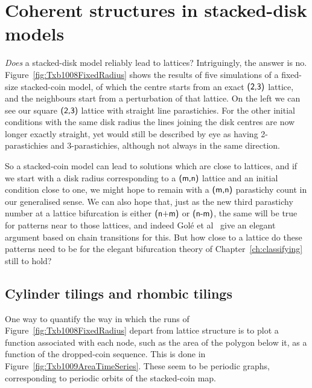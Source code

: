 \section{Coherent structures in stacked-disk models}

\textit{Does} a stacked-disk model reliably lead to lattices? Intriguingly, the answer is no. 
Figure~\ref{fig:Txb1008FixedRadius} shows the results of five simulations of a fixed-size stacked-coin model, of which the centre starts from an exact $\textsf{(2,3)}$ lattice, and the neighbours start from a perturbation of that lattice.
On the left we can see our square $\textsf{(2,3)}$ lattice with straight line parastichies. For the other initial conditions with the same disk radius the lines joining the disk centres are now longer exactly straight, yet would still be described by eye as having 2-parastichies and 3-parastichies, although not always in the same direction.

So a stacked-coin model can lead to solutions which are close to lattices, and if we start with a disk radius corresponding to a $\textsf{(m,n)}$ lattice and an initial condition close to one, we might  hope to remain with a $\textsf{(m,n)}$ parastichy count in our generalised sense. We can also hope that, just as the new third parastichy number at a lattice bifurcation is either $\textsf{(n+m)}$ or $\textsf{(n-m)}$, the same will be true for patterns near to those lattices, and indeed Golé et al~\cite{goleFibonacciQuasisymmetricPhyllotaxis2016} give an elegant argument based on chain transitions for this. But how close to a lattice do these patterns need to be for  the  elegant bifurcation theory of Chapter~\ref{ch:classifying} still to hold? 


\subsection{Cylinder tilings and rhombic tilings}
\label{sec:tilings}

One way to quantify the way in which the runs of Figure~\ref{fig:Txb1008FixedRadius} depart from lattice structure is to plot a function associated with each node, such as the area of the polygon below it,  as a function of the dropped-coin sequence. This is done in Figure~\ref{fig:Txb1009AreaTimeSeries}. These seem to be periodic graphs, corresponding to periodic orbits of the stacked-coin map. 


